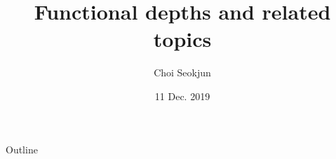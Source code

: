 \documentclass[aspectratio=169,ignorenonframetext,9pt]{beamer}
\title{Functional depths and related topics}
\author{Choi Seokjun}
\date{11 Dec. 2019}
\theoremstyle{plain}
\theoremstyle{definition}
\begin{document}
\begin{frame}
\maketitle
\end{frame}




\begin{frame}{Outline}
\tableofcontents
\end{frame}
\end{document}
